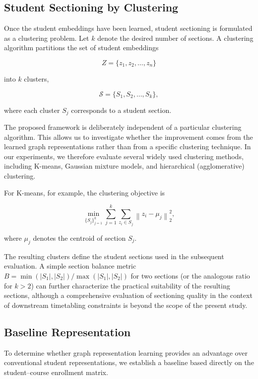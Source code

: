 \documentclass[pdflatex,sn-mathphys-num,iicol]{sn-jnl}%
\theoremstyle{thmstyleone}%
\theoremstyle{thmstyletwo}%
\theoremstyle{thmstylethree}%
\begin{document}
\subsection{Student Sectioning by Clustering}
\label{subsec:clustering}

Once the student embeddings have been learned, student sectioning is formulated as a clustering problem. Let $k$ denote the desired number of sections. A clustering algorithm partitions the set of student embeddings

$$
Z=\{z_1,z_2,\ldots,z_n\}
$$

into $k$ clusters,

$$
\mathcal{S}=\{S_1,S_2,\ldots,S_k\},
$$

where each cluster $S_j$ corresponds to a student section.

The proposed framework is deliberately independent of a particular clustering algorithm. This allows us to investigate whether the improvement comes from the learned graph representations rather than from a specific clustering technique. In our experiments, we therefore evaluate several widely used clustering methods, including K-means, Gaussian mixture models, and hierarchical (agglomerative) clustering.




For K-means, for example, the clustering objective is

$$
\min_{\{S_j\}_{j=1}^{k}}
\sum_{j=1}^{k}
\sum_{z_i\in S_j}
\left\|z_i-\mu_j\right\|_2^2,
$$

where $\mu_j$ denotes the centroid of section $S_j$.

The resulting clusters define the student sections used in the subsequent evaluation. A simple section balance metric $B = \min(|S_1|,|S_2|) / \max(|S_1|,|S_2|)$ for two sections (or the analogous ratio for $k>2$) can further characterize the practical suitability of the resulting sections, although a comprehensive evaluation of sectioning quality in the context of downstream timetabling constraints is beyond the scope of the present study.


\subsection{Baseline Representation}
\label{subsec:baseline}

To determine whether graph representation learning provides an advantage over conventional student representations, we establish a baseline based directly on the student--course enrollment matrix.
\end{document}
